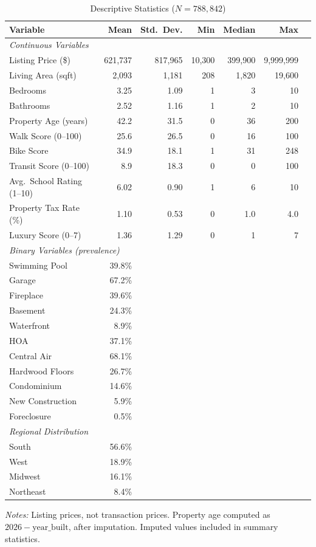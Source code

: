 \begin{table}[H]
\centering
\caption{Descriptive Statistics ($N = 788{,}842$)}
\label{tab:descriptive}
\begin{threeparttable}
\small
\begin{tabular}{lrrrrrr}
\toprule
Variable & Mean & Std.\ Dev. & Min & Median & Max \\
\midrule
\multicolumn{6}{l}{\textit{Continuous Variables}} \\
Listing Price (\$) & 621,737 & 817,965 & 10,300 & 399,900 & 9,999,999 \\
Living Area (sqft) & 2,093 & 1,181 & 208 & 1,820 & 19,600 \\
Bedrooms & 3.25 & 1.09 & 1 & 3 & 10 \\
Bathrooms & 2.52 & 1.16 & 1 & 2 & 10 \\
Property Age (years) & 42.2 & 31.5 & 0 & 36 & 200 \\
Walk Score (0--100) & 25.6 & 26.5 & 0 & 16 & 100 \\
Bike Score & 34.9 & 18.1 & 1 & 31 & 248 \\
Transit Score (0--100) & 8.9 & 18.3 & 0 & 0 & 100 \\
Avg.\ School Rating (1--10) & 6.02 & 0.90 & 1 & 6 & 10 \\
Property Tax Rate (\%) & 1.10 & 0.53 & 0 & 1.0 & 4.0 \\
Luxury Score (0--7) & 1.36 & 1.29 & 0 & 1 & 7 \\
\midrule
\multicolumn{6}{l}{\textit{Binary Variables (prevalence)}} \\
Swimming Pool & 39.8\% & & & & \\
Garage & 67.2\% & & & & \\
Fireplace & 39.6\% & & & & \\
Basement & 24.3\% & & & & \\
Waterfront & 8.9\% & & & & \\
HOA & 37.1\% & & & & \\
Central Air & 68.1\% & & & & \\
Hardwood Floors & 26.7\% & & & & \\
Condominium & 14.6\% & & & & \\
New Construction & 5.9\% & & & & \\
Foreclosure & 0.5\% & & & & \\
\midrule
\multicolumn{6}{l}{\textit{Regional Distribution}} \\
South & 56.6\% & & & & \\
West & 18.9\% & & & & \\
Midwest & 16.1\% & & & & \\
Northeast & 8.4\% & & & & \\
\bottomrule
\end{tabular}
\begin{tablenotes}
\small
\item \textit{Notes:} Listing prices, not transaction prices. Property age computed as $2026 - \text{year\_built}$, after imputation. Imputed values included in summary statistics.
\end{tablenotes}
\end{threeparttable}
\end{table}

